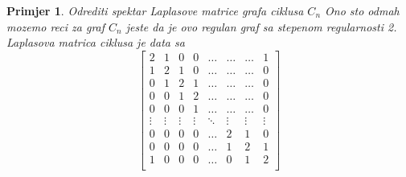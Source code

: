 \documentclass[11pt]{article}
\newtheorem{example}{Primjer}
\begin{document}
	\begin{example}
		Odrediti spektar Laplasove matrice grafa ciklusa $C_n$
	Ono sto odmah mozemo reci za graf $C_n$ jeste da je ovo regulan graf sa stepenom regularnosti 2. 
	Laplasova matrica ciklusa je data sa
	\[
	\begin{bmatrix}
	
	2 & 1 & 0 & 0 & \dots & \dots & \dots & 1 \\
	1 & 2 & 1 & 0 & \dots & \dots & \dots & 0 \\
	0 & 1 & 2 & 1 & \dots & \dots & \dots & 0 \\
	0 & 0 & 1 & 2 & \dots & \dots & \dots & 0 \\
	0 & 0 & 0 & 1 & \dots & \dots & \dots & 0 \\
	\vdots  & \vdots  & \vdots  & \vdots  & \ddots & \vdots & \vdots & \vdots  \\
	0 & 0 & 0 & 0 & \dots & 2 & 1 & 0 \\
	0 & 0 & 0 & 0 & \dots & 1 & 2 & 1 \\
	1 & 0 & 0 & 0 & \dots & 0 & 1 & 2 \\
	\end{bmatrix}
	\]
	

\end{example}
\end{document}
